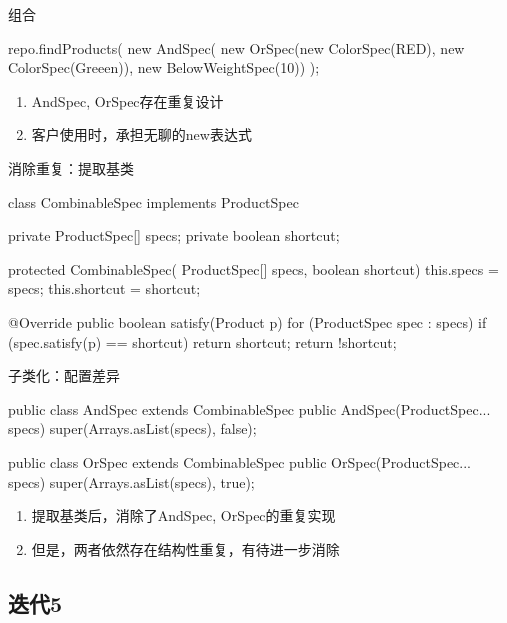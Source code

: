 \begin{frame}[fragile]{组合}
  \begin{java}
repo.findProducts(
  new AndSpec(
    new OrSpec(new ColorSpec(RED), new ColorSpec(Greeen)), 
    new BelowWeightSpec(10))
);
  \end{java}

\begin{enumerate}
  \item AndSpec, OrSpec存在重复设计
  \item 客户使用时，承担无聊的new表达式  
\end{enumerate}    
\end{frame}

\begin{frame}[fragile]{消除重复：提取基类}
  \begin{java}
class CombinableSpec implements ProductSpec {
  private ProductSpec[] specs;
  private boolean shortcut;

  protected CombinableSpec(
    ProductSpec[] specs, boolean shortcut) {
    this.specs = specs;
    this.shortcut = shortcut;
  }

  @Override
  public boolean satisfy(Product p) {
    for (ProductSpec spec : specs) {
      if (spec.satisfy(p) == shortcut)
        return shortcut;
    }
    return !shortcut;
  }
}
  \end{java}
\end{frame}

\begin{frame}[fragile]{子类化：配置差异}
  \begin{java}
public class AndSpec extends CombinableSpec {
  public AndSpec(ProductSpec... specs) {
    super(Arrays.asList(specs), false);
  }
}

public class OrSpec extends CombinableSpec {
  public OrSpec(ProductSpec... specs) {
    super(Arrays.asList(specs), true);
  }
}
  \end{java}

\begin{enumerate}
  \item 提取基类后，消除了AndSpec, OrSpec的重复实现
  \item 但是，两者依然存在结构性重复，有待进一步消除
\end{enumerate}   
\end{frame}

\subsection{迭代5}

